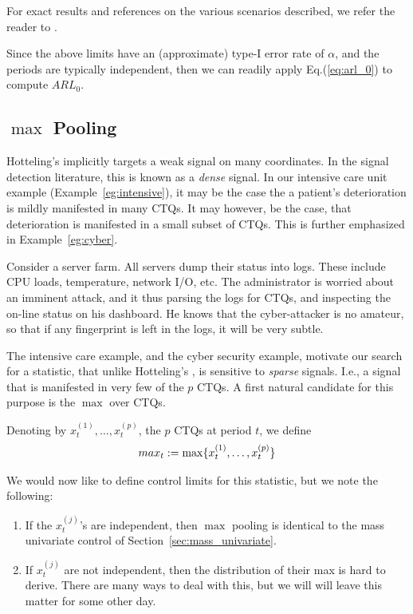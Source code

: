\begin{extra}
For exact results and references on the various scenarios described, we refer the reader to \cite[Ch.7]{qiu_introduction_2013}.
\end{extra}

Since the above limits have an (approximate) type-I error rate of $\alpha$, and the periods are typically independent, then we can readily apply Eq.(\ref{eq:arl_0}) to compute $ARL_0$.



\subsection{$\max$ Pooling}
Hotteling's \tsq implicitly targets a weak signal on many coordinates. 
In the signal detection literature, this is known as a \emph{dense} signal.
In our intensive care unit example (Example~\ref{eg:intensive}), it may be the case the a patient's deterioration is mildly manifested in many CTQs. It may however, be the case, that deterioration is manifested in a small subset of CTQs.
This is further emphasized in Example~\ref{eg:cyber}.

\begin{example}
\label{eg:cyber}
Consider a server farm. All servers dump their status into logs. These include CPU loads, temperature, network I/O, etc.
The administrator is worried about an imminent attack, and it thus parsing the logs for CTQs, and inspecting the on-line status on his dashboard.
He knows that the cyber-attacker is no amateur, so that if any fingerprint is left in the logs, it will be very subtle. 
\end{example}

The intensive care example, and the cyber security example, motivate our search for a statistic, that unlike Hotteling's \tsq, is sensitive to \emph{sparse} signals. 
I.e., a signal that is manifested in very few of the $p$ CTQs.
A first natural candidate for this purpose is the $\max$ over CTQs.
\begin{definition}
Denoting by $x^{(1)}_t,\dots,x^{(p)}_t$, the $p$ CTQs at period $t$, we define
\begin{align}
	max_t:= \max\{ x^{(1)}_t,\dots,x^{(p)}_t \}
\end{align}
\end{definition}
We would now like to define control limits for this statistic, but we note the following:
\begin{enumerate}
\item If the $x_t^{(j)}$'s are independent, then $\max$ pooling is identical to the mass univariate control of Section~\ref{sec:mass_univariate}.
\item If $x_t^{(j)}$ are not independent, then the distribution of their max is hard to derive. There are many ways to deal with this, but we will will leave this matter for some other day.
\end{enumerate}




